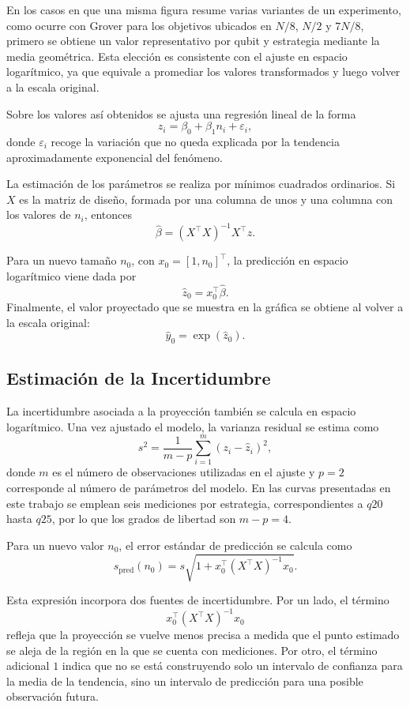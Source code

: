 En los casos en que una misma figura resume varias variantes de un experimento, como ocurre
con Grover para los objetivos ubicados en \(N/8\), \(N/2\) y \(7N/8\), primero se obtiene un
valor representativo por qubit y estrategia mediante la media geométrica. Esta elección es
consistente con el ajuste en espacio logarítmico, ya que equivale a promediar los valores
transformados y luego volver a la escala original.

Sobre los valores así obtenidos se ajusta una regresión lineal de la forma
\[
z_i = \beta_0 + \beta_1 n_i + \varepsilon_i,
\]
donde \(\varepsilon_i\) recoge la variación que no queda explicada por la tendencia
aproximadamente exponencial del fenómeno.

La estimación de los parámetros se realiza por mínimos cuadrados ordinarios. Si \(X\) es la
matriz de diseño, formada por una columna de unos y una columna con los valores de \(n_i\),
entonces
\[
\hat{\beta} = (X^\top X)^{-1} X^\top z.
\]

Para un nuevo tamaño \(n_0\), con \(x_0 = [1, n_0]^\top\), la predicción en espacio
logarítmico viene dada por
\[
\hat{z}_0 = x_0^\top \hat{\beta}.
\]
Finalmente, el valor proyectado que se muestra en la gráfica se obtiene al volver a la escala
original:
\[
\hat{y}_0 = \exp(\hat{z}_0).
\]

\subsection*{Estimación de la Incertidumbre}

La incertidumbre asociada a la proyección también se calcula en espacio logarítmico. Una vez
ajustado el modelo, la varianza residual se estima como
\[
s^2 = \frac{1}{m-p}\sum_{i=1}^{m}(z_i-\hat{z}_i)^2,
\]
donde \(m\) es el número de observaciones utilizadas en el ajuste y \(p=2\) corresponde al
número de parámetros del modelo. En las curvas presentadas en este trabajo se emplean seis
mediciones por estrategia, correspondientes a \(q20\) hasta \(q25\), por lo que los grados de
libertad son \(m-p=4\).

Para un nuevo valor \(n_0\), el error estándar de predicción se calcula como
\[
s_{\mathrm{pred}}(n_0)
=
s\sqrt{1+x_0^\top (X^\top X)^{-1}x_0}.
\]

Esta expresión incorpora dos fuentes de incertidumbre. Por un lado, el término
\[
x_0^\top (X^\top X)^{-1}x_0
\]
refleja que la proyección se vuelve menos precisa a medida que el punto estimado se aleja de la región en la que se cuenta con mediciones. Por otro, el
término adicional \(1\) indica que no se está construyendo solo un intervalo de confianza para
la media de la tendencia, sino un intervalo de predicción para una posible observación futura.

